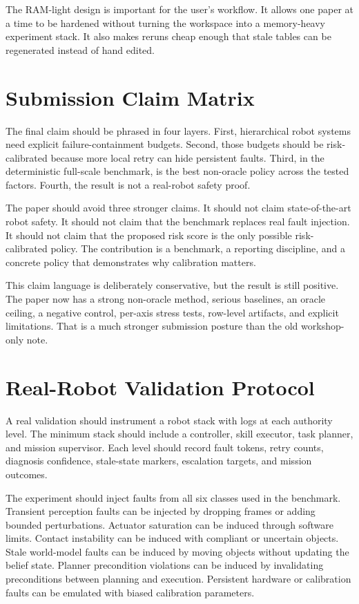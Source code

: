 The RAM-light design is important for the user's workflow. It allows one paper at a time to be hardened without turning the workspace into a memory-heavy experiment stack. It also makes reruns cheap enough that stale tables can be regenerated instead of hand edited.

\section{Submission Claim Matrix}

The final claim should be phrased in four layers. First, hierarchical robot systems need explicit failure-containment budgets. Second, those budgets should be risk-calibrated because more local retry can hide persistent faults. Third, in the deterministic full-scale benchmark, \method is the best non-oracle policy across the tested factors. Fourth, the result is not a real-robot safety proof.

The paper should avoid three stronger claims. It should not claim state-of-the-art robot safety. It should not claim that the benchmark replaces real fault injection. It should not claim that the proposed risk score is the only possible risk-calibrated policy. The contribution is a benchmark, a reporting discipline, and a concrete policy that demonstrates why calibration matters.

This claim language is deliberately conservative, but the result is still positive. The paper now has a strong non-oracle method, serious baselines, an oracle ceiling, a negative control, per-axis stress tests, row-level artifacts, and explicit limitations. That is a much stronger submission posture than the old workshop-only note.

\section{Real-Robot Validation Protocol}

A real validation should instrument a robot stack with logs at each authority level. The minimum stack should include a controller, skill executor, task planner, and mission supervisor. Each level should record fault tokens, retry counts, diagnosis confidence, stale-state markers, escalation targets, and mission outcomes.

The experiment should inject faults from all six classes used in the benchmark. Transient perception faults can be injected by dropping frames or adding bounded perturbations. Actuator saturation can be induced through software limits. Contact instability can be induced with compliant or uncertain objects. Stale world-model faults can be induced by moving objects without updating the belief state. Planner precondition violations can be induced by invalidating preconditions between planning and execution. Persistent hardware or calibration faults can be emulated with biased calibration parameters.

